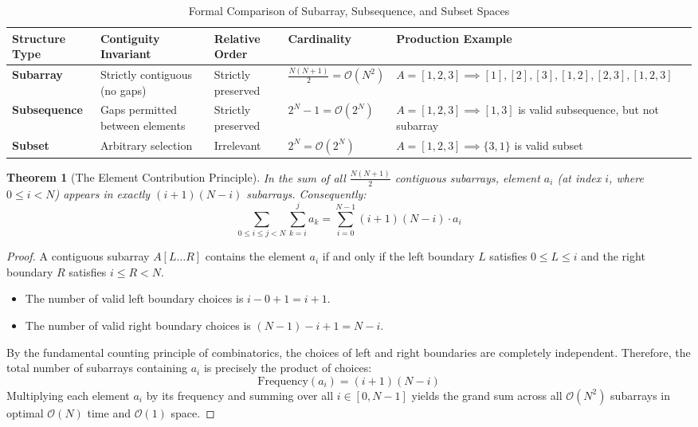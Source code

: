 \documentclass[10pt,journal,compsoc,onecolumn]{IEEEtran}
\newtheorem{theorem}{Theorem}
\begin{document}
\begin{table}[t]
\caption{Formal Comparison of Subarray, Subsequence, and Subset Spaces}
\label{tab:sequence_comparison}
\centering
\begin{tabular}{p{3.0cm}p{3.2cm}p{3.0cm}p{2.2cm}p{4.0cm}}
\toprule
\textbf{Structure Type} & \textbf{Contiguity Invariant} & \textbf{Relative Order} & \textbf{Cardinality} & \textbf{Production Example} \\
\midrule
\textbf{Subarray} & Strictly contiguous (no gaps) & Strictly preserved & $\frac{N(N+1)}{2} = \mathcal{O}(N^2)$ & $A = [1, 2, 3] \implies [1], [2], [3], [1, 2], [2, 3], [1, 2, 3]$ \\
\midrule
\textbf{Subsequence} & Gaps permitted between elements & Strictly preserved & $2^N - 1 = \mathcal{O}(2^N)$ & $A = [1, 2, 3] \implies [1, 3]$ is valid subsequence, but not subarray \\
\midrule
\textbf{Subset} & Arbitrary selection & Irrelevant & $2^N = \mathcal{O}(2^N)$ & $A = [1, 2, 3] \implies \{3, 1\}$ is valid subset \\
\bottomrule
\end{tabular}
\end{table}

\begin{theorem}[The Element Contribution Principle]
In the sum of all $\frac{N(N+1)}{2}$ contiguous subarrays, element $a_i$ (at index $i$, where $0 \le i < N$) appears in exactly $(i + 1)(N - i)$ subarrays. Consequently:
\begin{equation}
\sum_{0 \le i \le j < N} \sum_{k=i}^{j} a_k = \sum_{i=0}^{N-1} (i + 1)(N - i) \cdot a_i
\end{equation}
\end{theorem}
\begin{proof}
A contiguous subarray $A[L \dots R]$ contains the element $a_i$ if and only if the left boundary $L$ satisfies $0 \le L \le i$ and the right boundary $R$ satisfies $i \le R < N$. 
\begin{itemize}
    \item The number of valid left boundary choices is $i - 0 + 1 = i + 1$.
    \item The number of valid right boundary choices is $(N - 1) - i + 1 = N - i$.
\end{itemize}
By the fundamental counting principle of combinatorics, the choices of left and right boundaries are completely independent. Therefore, the total number of subarrays containing $a_i$ is precisely the product of choices:
\begin{equation}
\text{Frequency}(a_i) = (i + 1)(N - i)
\end{equation}
Multiplying each element $a_i$ by its frequency and summing over all $i \in [0, N-1]$ yields the grand sum across all $\mathcal{O}(N^2)$ subarrays in optimal $\mathcal{O}(N)$ time and $\mathcal{O}(1)$ space.
\end{proof}
\end{document}
